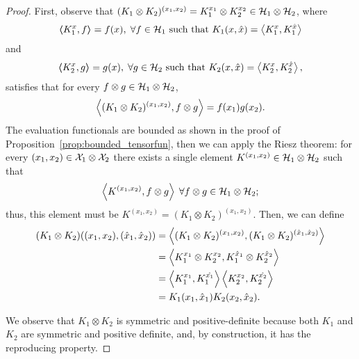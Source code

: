 \begin{proof}
    First, observe that $(K_1 \otimes K_2)^{(x_1 , x_2)} =  K_1^{x_1} \otimes K_2^{x_2}  \in \mathcal{H}_1 \otimes \mathcal{H}_2$,
    where
    \begin{equation}\nonumber
        \bm{\left\langle} K_1^{x}, f \bm{\right\rangle} = f(x) , \; \forall f \in \mathcal{H}_1 \text{ such that } K_1(x, \hat{x}) = \bm{\left\langle} K_1^{x}, K_1^{\hat{x}} \bm{\right\rangle}
    \end{equation}
    and
    \begin{equation}\nonumber
        \bm{\left\langle} K_2^{x}, g \bm{\right\rangle} = g(x) , \; \forall g \in \mathcal{H}_2 \text{ such that } K_2(x, \hat{x}) = \bm{\left\langle} K_2^{x}, K_2^{\hat{x}} \bm{\right\rangle} ,
    \end{equation}
    satisfies that for every $f \otimes g \in \mathcal{H}_1 \otimes \mathcal{H}_2$,
    \begin{equation}\nonumber
        \bm{\left\langle} (K_1 \otimes K_2)^{(x_1 , x_2)}, f \otimes g \bm{\right\rangle} = f(x_1) g(x_2) .
    \end{equation}
    The evaluation functionals are bounded as shown in the proof of Proposition~\ref{prop:bounded_tensorfun}, then we can apply the Riesz theorem: for every $(x_1 , x_2) \in \mathcal{X}_1 \otimes \mathcal{X}_2$ there exists a single element $K^{(x_1 , x_2)} \in \mathcal{H}_1 \otimes \mathcal{H}_2$ such that
    \begin{equation}
        \nonumber
        \bm{\left\langle} K^{(x_1 , x_2)}, f \otimes g \bm{\right\rangle}\;  \forall f \otimes g \in \mathcal{H}_1 \otimes \mathcal{H}_2 ;
    \end{equation}
    thus, this element must be $K^{(x_1 , x_2)} = (K_1 \otimes K_2)^{(x_1 , x_2)}$.
    Then, we can define
    \begin{align*}
        (K_1 \otimes K_2)((x_1 , x_2), (\hat{x}_1 , \hat{x}_2)) & = \bm{\left\langle} (K_1 \otimes K_2)^{(x_1 , x_2)}, (K_1 \otimes K_2)^{(\hat{x}_1 , \hat{x}_2)} \bm{\right\rangle} \\
                                                                & = \bm{\left\langle} K_1^{x_1} \otimes K_2^{x_2}, K_1^{\hat{x}_1} \otimes K_2^{\hat{x}_2} \bm{\right\rangle}         \\
                                                                & = \bm{\left\langle} K_1^{x_1}, K_1^{\hat{x_1}} \bm{\right\rangle} \bm{\left\langle} K_2^{x_2}, K_2^{\hat{x_2}} \bm{\right\rangle}                 \\
                                                                & = K_1(x_1, \hat{x}_1) K_2(x_2, \hat{x}_2) .
    \end{align*}


    We observe that $K_1 \otimes K_2$ is symmetric and positive-definite because both $K_1$ and $K_2$ are symmetric and positive definite, %
    and, by construction, it has the reproducing property.
\end{proof}
